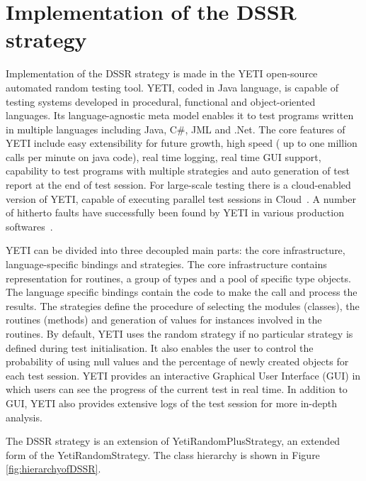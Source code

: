 

\section{Implementation of the DSSR strategy}\label{sec:imp}

Implementation of the DSSR strategy is made in the YETI open-source automated random testing tool. YETI, coded in Java language, is capable of testing systems developed in procedural, functional and object-oriented languages. Its language-agnostic meta model enables it to test programs written in multiple languages including Java, C\#, JML and .Net. The core features of YETI include easy extensibility for future growth, high speed ( up to one million calls per minute on java code), real time logging, real time GUI support, capability to test programs with multiple strategies and auto generation of test report at the end of test session. For large-scale testing there is a cloud-enabled version of YETI, capable of executing parallel test sessions in Cloud~\cite{Oriol2010}. A number of hitherto faults have successfully been found by YETI in various production softwares~\cite{Oriol2011, Oriol2012}.

YETI can be divided into three decoupled main parts: the core infrastructure, language-specific bindings and strategies. The core infrastructure contains representation for routines, a group of types and a pool of specific type objects. The language specific bindings contain the code to make the call and process the results. The strategies define the procedure of selecting the modules (classes), the routines (methods) and generation of values for instances involved in the routines. By default, YETI uses the random strategy if no particular strategy is defined during test initialisation. It also enables the user to control the probability of using null values and the percentage of newly created objects for each test session. YETI provides an interactive Graphical User Interface (GUI) in which users can see the progress of the current test in real time. In addition to GUI, YETI also provides extensive logs of the test session for more in-depth analysis.

The DSSR strategy is an extension of YetiRandomPlusStrategy, an extended form of the YetiRandomStrategy. The class hierarchy is shown in Figure \ref{fig:hierarchyofDSSR}.

